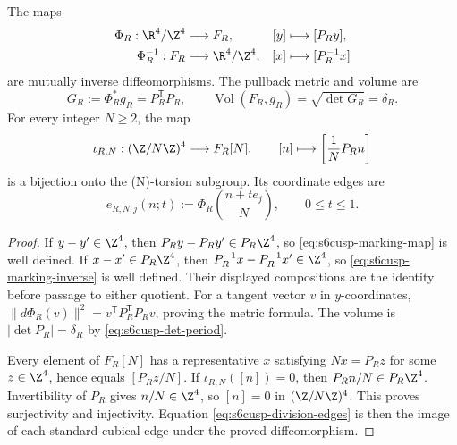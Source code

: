 \begin{proposition}
\label{prop:s6cusp-marking-cellulation}
The maps
\begin{align}
 \Phi_R:\R^4/\Z^4&\longrightarrow F_R,
 &[y]&\longmapsto[P_Ry],
 \label{eq:s6cusp-marking-map}\\
 \Phi_R^{-1}:F_R&\longrightarrow\R^4/\Z^4,
 &[x]&\longmapsto[P_R^{-1}x]
 \label{eq:s6cusp-marking-inverse}
\end{align}
are mutually inverse diffeomorphisms.  The pullback metric and volume are
\begin{equation}\label{eq:s6cusp-marking-metric-volume}
 G_R:=\Phi_R^*g_R=P_R^{\mathsf T}P_R,\qquad
 \operatorname{Vol}(F_R,g_R)=\sqrt{\det G_R}=\delta_R.
\end{equation}
For every integer \(N\ge2\), the map
\begin{equation}\label{eq:s6cusp-division-map}
 \iota_{R,N}:(\Z/N\Z)^4\longrightarrow F_R[N],\qquad
 [n]\longmapsto\left[\frac1N P_Rn\right]
\end{equation}
is a bijection onto the (N)-torsion subgroup.  Its coordinate edges are
\begin{equation}\label{eq:s6cusp-division-edges}
 e_{R,N,j}(n;t):=
 \Phi_R\!\left(\frac{n+te_j}{N}\right),\qquad0\le t\le1.
\end{equation}
\end{proposition}

\begin{proof}
If \(y-y'\in\Z^4\), then \(P_Ry-P_Ry'\in P_R\Z^4\), so
\eqref{eq:s6cusp-marking-map} is well defined.  If
\(x-x'\in P_R\Z^4\), then \(P_R^{-1}x-P_R^{-1}x'\in\Z^4\), so
\eqref{eq:s6cusp-marking-inverse} is well defined.  Their displayed
compositions are the identity before passage to either quotient.  For a
tangent vector \(v\) in \(y\)-coordinates,
\(\lVert d\Phi_R(v)\rVert^2=v^{\mathsf T}P_R^{\mathsf T}P_Rv\), proving
the metric formula.  The volume is
\(|\det P_R|=\delta_R\) by
\eqref{eq:s6cusp-det-period}.

Every element of \(F_R[N]\) has a representative \(x\) satisfying
\(Nx=P_Rz\) for some \(z\in\Z^4\), hence equals
\([P_Rz/N]\).  If \(\iota_{R,N}([n])=0\), then
\(P_Rn/N\in P_R\Z^4\).  Invertibility of \(P_R\) gives
\(n/N\in\Z^4\), so \([n]=0\) in \((\Z/N\Z)^4\).  This proves
surjectivity and injectivity.  Equation
\eqref{eq:s6cusp-division-edges} is then the image of each standard cubical
edge under the proved diffeomorphism.
\end{proof}

